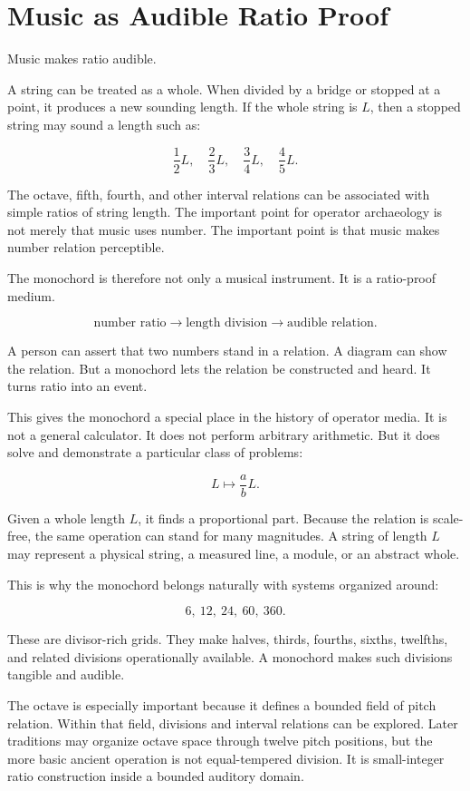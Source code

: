 \documentclass[11pt]{book}
\begin{document}
\section{Music as Audible Ratio Proof}

Music makes ratio audible.

A string can be treated as a whole. When divided by a bridge or stopped at a point, it produces a new sounding length. If the whole string is \(L\), then a stopped string may sound a length such as:

\[
\frac{1}{2}L,
\quad
\frac{2}{3}L,
\quad
\frac{3}{4}L,
\quad
\frac{4}{5}L.
\]

The octave, fifth, fourth, and other interval relations can be associated with simple ratios of string length. The important point for operator archaeology is not merely that music uses number.  The important point is that music makes number relation perceptible.

The monochord is therefore not only a musical instrument. It is a ratio-proof medium.

\[
\text{number ratio}
\rightarrow
\text{length division}
\rightarrow
\text{audible relation}.
\]

A person can assert that two numbers stand in a relation. A diagram can show the relation. But a monochord lets the relation be constructed and heard. It turns ratio into an event.

This gives the monochord a special place in the history of operator media. It is not a general calculator. It does not perform arbitrary arithmetic. But it does solve and demonstrate a particular class of problems:

\[
L \mapsto \frac{a}{b}L.
\]

Given a whole length \(L\), it finds a proportional part. Because the relation is scale-free, the same operation can stand for many magnitudes. A string of length \(L\) may represent a physical string, a measured line, a module, or an abstract whole.

This is why the monochord belongs naturally with systems organized around:

\[
6,\ 12,\ 24,\ 60,\ 360.
\]

These are divisor-rich grids. They make halves, thirds, fourths, sixths, twelfths, and related divisions operationally available. A monochord makes such divisions tangible and audible.

The octave is especially important because it defines a bounded field of pitch relation. Within that field, divisions and interval relations can be explored. Later traditions may organize octave space through twelve pitch positions, but the more basic ancient operation is not equal-tempered division. It is small-integer ratio construction inside a bounded auditory domain.
\end{document}

